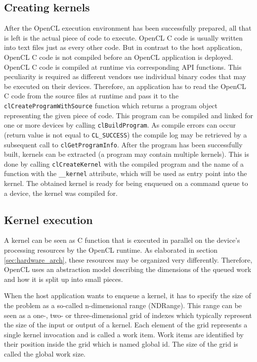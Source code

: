 \subsection{Creating kernels}
After the OpenCL execution environment has been successfully prepared, all that is left is the actual piece of code to execute. OpenCL C code is usually written into text files just as every other code. But in contrast to the host application, OpenCL C code is not compiled before an OpenCL application is deployed. OpenCL C code is compiled at runtime via corresponding API functions. This peculiarity is required as different vendors use individual binary codes that may be executed on their devices.
Therefore, an application has to read the OpenCL C code from the source files at runtime and pass it to the \lstinline!clCreateProgramWithSource! function which returns a program object representing the given piece of code. This program can be compiled and linked for one or more devices by calling \lstinline!clBuildProgram!. As compile errors can occur (return value is not equal to \lstinline!CL_SUCCESS!) the compile log may be retrieved by a subsequent call to \lstinline!clGetProgramInfo!. After the program has been successfully built, kernels can be extracted (a program may contain multiple kernels). This is done by calling \lstinline!clCreateKernel! with the compiled program and the name of a function with the \lstinline!__kernel! attribute, which will be used as entry point into the kernel. The obtained kernel is ready for being enqueued on a command queue to a device, the kernel was compiled for. \cite[p.26, 27]{opencl_book}

\subsection{Kernel execution}
\label{sec:kernel_execcution}
A kernel can be seen as C function that is executed in parallel on the device's processing resources by the OpenCL runtime. As elaborated in section \ref{sec:hardware_arch}, these resources may be organized very differently. Therefore, OpenCL uses an abstraction model describing the dimensions of the queued work and how it is split up into small pieces. \cite[p.16]{opencl_book}

When the host application wants to enqueue a kernel, it has to specify the size of the problem as a so-called n-dimensional range (NDRange). This range can be seen as a one-, two- or three-dimensional grid of indexes which typically represent the size of the input or output of a kernel. Each element of the grid represents a single kernel invocation and is called a work item. Work items are identified by their position inside the grid which is named global id. The size of the grid is called the global work size. \cite[p.18]{opencl_book}

